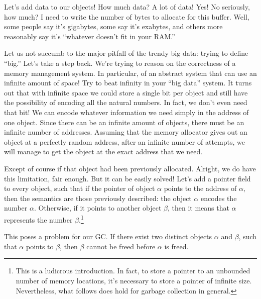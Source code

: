 Let's add data to our objects!
How much data?
A lot of data!
Yes!
No seriously, how much?
I need to write the number of bytes to allocate for this buffer.
Well, some people say it's gigabytes, some say it's exabytes, and others more reasonably say it's ``whatever doesn't fit in your RAM.''

Let us not succumb to the major pitfall of the trendy big data: trying to define ``big.''
Let's take a step back.
We're trying to reason on the correctness of a memory management system.
In particular, of an abstract system that can use an infinite amount of space!
Try to beat infinity in your ``big data'' system.
It turns out that with infinite space we could store a single bit per object and still have the possibility of encoding all the natural numbers.
In fact, we don't even need that bit!
We can encode whatever information we need simply in the address of one object.
Since there can be an infinite amount of objects, there must be an infinite number of addresses.
Assuming that the memory allocator gives out an object at a perfectly random address, after an infinite number of attempts, we will manage to get the object at the exact address that we need.

Except of course if that object had been previously allocated.
Alright, we do have this limitation, fair enough.
But it can be easily solved!
Let's add a pointer field to every object, such that if the pointer of object $\alpha$ points to the address of $\alpha$, then the semantics are those previously described: the object $\alpha$ encodes the number $\alpha$.
Otherwise, if it points to another object $\beta$, then it means that $\alpha$ represents the number $\beta$.\footnote{%
	This is a ludicrous introduction.
	In fact, to store a pointer to an unbounded number of memory locations, it's necessary to store a pointer of infinite size.
	Nevertheless, what follows does hold for garbage collection in general.
}

This poses a problem for our GC.
If there exist two distinct objects $\alpha$ and $\beta$, such that $\alpha$ points to $\beta$, then $\beta$ cannot be freed before $\alpha$ is freed.
